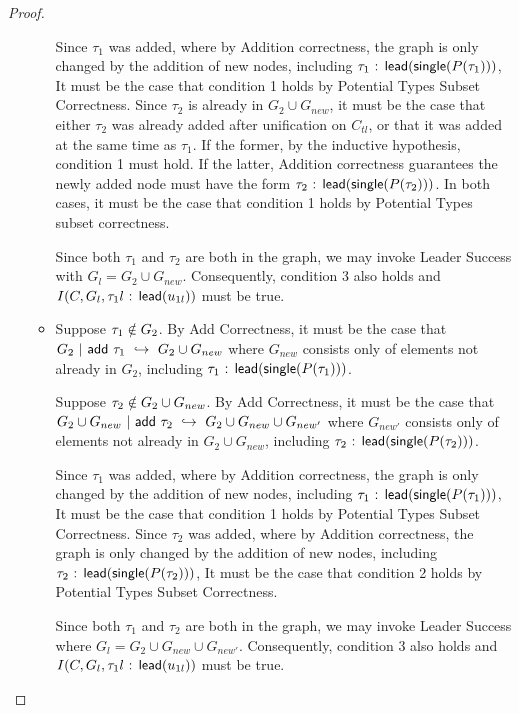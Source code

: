 \begin{proof}
\begin{itemize}
\begin{itemize}
        Since $\tau_1$ was added, where by Addition correctness, the graph is only changed by the addition of new nodes, including $\tau_1\normalfont\textsf{ : }\normalfont\textsf{lead}(\normalfont\textsf{single}(P(\tau_1)))$, It must be the case that condition 1 holds by Potential Types Subset Correctness. Since $\tau_2$ is already in $G_2 \cup G_{new}$, it must be the case that either $\tau_2$ was already added after unification on $C_{tl}$, or that it was added at the same time as $\tau_1$. If the former, by the inductive hypothesis, condition 1 must hold. If the latter, Addition correctness guarantees the newly added node must have the form $\tau_2\normalfont\textsf{ : }\normalfont\textsf{lead}(\normalfont\textsf{single}(P(\tau_2)))$. In both cases, it must be the case that condition 1 holds by Potential Types subset correctness.

        Since both $\tau_1$ and $\tau_2$ are both in the graph, we may invoke Leader Success with $G_l = G_2 \cup G_{new}$. Consequently, condition 3 also holds and $I(C, G_l, \tau_1l\normalfont\textsf{ : }\normalfont\textsf{lead}(u_{1l}))$ must be true.

        \item Suppose $\tau_1 \notin G_2$. By Add Correctness, it must be the case that $G_2~|~\normalfont\textsf{add}~\tau_1 ~\hookrightarrow~ G_2 \cup G_{new}$ where $G_{new}$ consists only of elements not already in $G_2$, including $\tau_1\normalfont\textsf{ : }\normalfont\textsf{lead}(\normalfont\textsf{single}(P(\tau_1)))$. 
        
        Suppose $\tau_2 \notin G_2 \cup G_{new}$. By Add Correctness, it must be the case that $G_2 \cup G_{new}~|~\normalfont\textsf{add}~\tau_2 ~\hookrightarrow~ G_2 \cup G_{new} \cup G_{new'}$ where $G_{new'}$ consists only of elements not already in $G_2 \cup G_{new}$, including $\tau_2\normalfont\textsf{ : }\normalfont\textsf{lead}(\normalfont\textsf{single}(P(\tau_2)))$. 

        Since $\tau_1$ was added, where by Addition correctness, the graph is only changed by the addition of new nodes, including $\tau_1\normalfont\textsf{ : }\normalfont\textsf{lead}(\normalfont\textsf{single}(P(\tau_1)))$, It must be the case that condition 1 holds by Potential Types Subset Correctness. Since $\tau_2$ was added, where by Addition correctness, the graph is only changed by the addition of new nodes, including $\tau_2\normalfont\textsf{ : }\normalfont\textsf{lead}(\normalfont\textsf{single}(P(\tau_2)))$, It must be the case that condition 2 holds by Potential Types Subset Correctness.

        Since both $\tau_1$ and $\tau_2$ are both in the graph, we may invoke Leader Success where $G_l = G_2 \cup G_{new} \cup G_{new'}$. Consequently, condition 3 also holds and $I(C, G_l, \tau_1l\normalfont\textsf{ : }\normalfont\textsf{lead}(u_{1l}))$ must be true.
    \end{itemize}
\end{itemize}
\end{proof}

